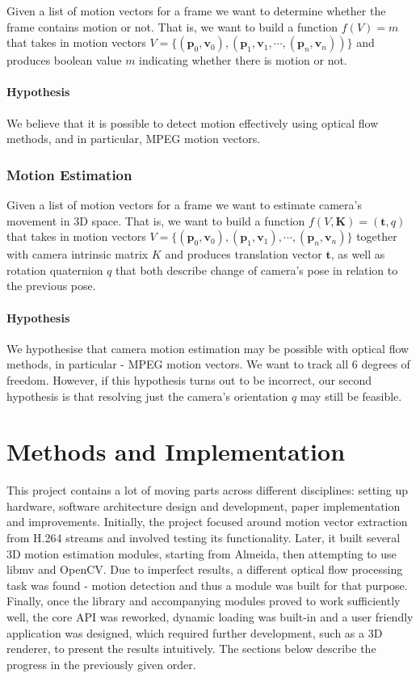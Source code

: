 \documentclass[11pt,english]{report}
\begin{document}
Given a list of motion vectors for a frame we want to determine whether the frame contains motion or not. That is, we want to build a function $f(V) = m$ that takes in motion vectors $V = \{(\mathbf{p}_0, \mathbf{v}_0), (\mathbf{p}_1, \mathbf{v}_1, \cdots, (\mathbf{p}_n, \mathbf{v}_n))\}$ and produces boolean value $m$ indicating whether there is motion or not.

\subsubsection{Hypothesis}

We believe that it is possible to detect motion effectively using optical flow methods, and in particular, MPEG motion vectors.

\subsection{Motion Estimation}

Given a list of motion vectors for a frame we want to estimate camera's movement in 3D space. That is, we want to build a function $f(V, \mathbf{K}) = (\mathbf{t}, q)$ that takes in motion vectors $V = \{(\mathbf{p}_0, \mathbf{v}_0), (\mathbf{p}_1, \mathbf{v}_1), \cdots, (\mathbf{p}_n, \mathbf{v}_n)\}$ together with camera intrinsic matrix $K$ and produces translation vector $\mathbf{t}$, as well as rotation quaternion $q$ that both describe change of camera's pose in relation to the previous pose.

\subsubsection{Hypothesis}

We hypothesise that camera motion estimation may be possible with optical flow methods, in particular - MPEG motion vectors. We want to track all 6 degrees of freedom. However, if this hypothesis turns out to be incorrect, our second hypothesis is that resolving just the camera's orientation $q$ may still be feasible.

\chapter{Methods and Implementation}

This project contains a lot of moving parts across different disciplines: setting up hardware, software architecture design and development, paper implementation and improvements. Initially, the project focused around motion vector extraction from H.264 streams and involved testing its functionality. Later, it built several 3D motion estimation modules, starting from Almeida, then attempting to use libmv and OpenCV. Due to imperfect results, a different optical flow processing task was found - motion detection and thus a module was built for that purpose. Finally, once the library and accompanying modules proved to work sufficiently well, the core API was reworked, dynamic loading was built-in and a user friendly application was designed, which required further development, such as a 3D renderer, to present the results intuitively. The sections below describe the progress in the previously given order.
\end{document}
